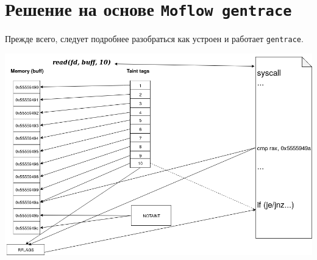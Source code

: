 \chapter{Решение на основе \texttt{Moflow gentrace}}

Прежде всего, следует подробнее разобраться как устроен и работает \texttt{gentrace}.

\includegraphics{img/source_tainting.png}


